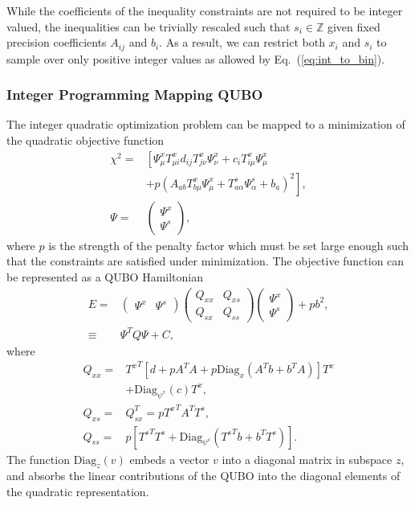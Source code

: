 \documentclass[prd,twocolumn,tightenlines,preprintnumbers,showpacs,superscriptaddress,notitlepage,nofootinbib,eqsecnum,floatfix,longbibliography]{revtex4}
\begin{document}
While the coefficients of the inequality constraints are not required to be integer valued, the inequalities can be trivially rescaled such that $s_i \in \mathbb{Z}$ given fixed precision coefficients $A_{ij}$ and $b_i$.
As a result, we can restrict both $x_i$ and $s_i$ to sample over only positive integer values as allowed by Eq.~(\ref{eq:int_to_bin}).

\subsubsection{Integer Programming Mapping QUBO}
\label{sec:methods:ilp-qubo}

The integer quadratic optimization problem can be mapped to a minimization of the quadratic objective function
\begin{align}
    \chi^2 = & \left[\Psi^x_{\mu} T^x_{\mu i}d_{ij} T^x_{j \nu}\Psi^x_\nu + c_i T^x_{i\mu} \Psi^x_\mu \right.
    \nonumber\\
    &\left.+ p (A_{a b} T^x_{b \mu} \Psi^x_{\mu} + T^s_{a \alpha} \Psi^s_\alpha + b_a)^2 \right],\\
    \Psi = & \begin{pmatrix}
    \Psi^x\\
    \Psi^s
    \end{pmatrix},
\end{align}
where $p$ is the strength of the penalty factor which must be set large enough such that the constraints are satisfied under minimization.
The objective function can be represented as a QUBO Hamiltonian
\begin{align}
    E = &
    \begin{pmatrix}
    \Psi^x & \Psi^s
    \end{pmatrix}
    \begin{pmatrix}
    Q_{xx} & Q_{xs}\\
    Q_{sx} & Q_{ss}
    \end{pmatrix}
    \begin{pmatrix}
    \Psi^x\\ \Psi^s
    \end{pmatrix} + pb^2,\\
    \equiv & \Psi^T Q \Psi + C,
    \label{eq:matrix_form}
\end{align}
where
\begin{align}
    Q_{xx} = & {T^{x}}^T \left[ d + p A^T A + p \mathrm{Diag}_{x} \left(A^T b + b^T A\right) \right] T^x \nonumber \\
    &+ \mathrm{Diag}_{\psi^x}(c) T^x,\\
    Q_{xs} = & Q_{sx}^T = p {T^{x}}^T A^T T^s,\\
    Q_{ss} = & p\left[ {T^{s}}^T T^s + \mathrm{Diag}_{\psi^s}\left( {T^{s}}^T b + b^T T^s\right) \right].
\end{align}
The function $\mathrm{Diag}_{z}(v)$ embeds a vector $v$ into a diagonal matrix in subspace $z$, and absorbs the linear contributions of the QUBO into the diagonal elements of the quadratic representation.
\end{document}
